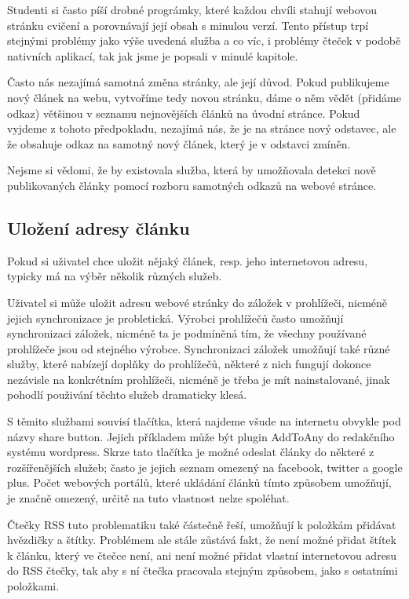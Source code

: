 Studenti si často píší drobné prográmky, které každou chvíli stahují webovou stránku cvičení a porovnávají její obsah s minulou verzí.
Tento přístup trpí stejnými problémy jako výše uvedená služba a co víc, i problémy čteček v podobě nativních aplikací, tak jak jsme je popsali v minulé kapitole. %

Často nás nezajímá samotná změna stránky, ale její důvod.
Pokud publikujeme nový článek na webu, vytvoříme tedy novou stránku, dáme o něm vědět (přidáme odkaz) většinou v seznamu nejnovějších článků na úvodní stránce.
Pokud vyjdeme z tohoto předpokladu, nezajímá nás, že je na stránce nový odstavec, ale že obsahuje odkaz na samotný nový článek, který je v odstavci zmíněn.

Nejsme si vědomi, že by existovala služba, která by umožňovala detekci nově publikovaných články pomocí rozboru samotných odkazů na webové stránce.

\subsection{Uložení adresy článku}

Pokud si uživatel chce uložit nějaký článek, resp. jeho internetovou adresu, typicky má na výběr několik různých služeb.

Uživatel si může uložit adresu webové stránky do záložek v prohlížeči, nicméně jejich synchronizace je probletická.
Výrobci prohlížečů často umožňují synchronizaci záložek, nicméně ta je podmíněná tím, že všechny používané prohlížeče jsou od stejného výrobce.
Synchronizaci záložek umožňují také různé služby, které nabízejí doplňky do prohlížečů, některé z nich fungují dokonce nezávisle na konkrétním prohlížeči, nicméně je třeba je mít nainstalované, jinak pohodlí použivání těchto služeb dramaticky klesá. %

S těmito službami souvisí tlačítka, která najdeme všude na internetu obvykle pod názvy share button.
Jejich příkladem může být plugin AddToAny do redakčního systému wordpress. %
Skrze tato tlačítka je možné odeslat články do některé z rozšířenějších služeb; často je jejich seznam omezený na facebook, twitter a google plus. %
Počet webových portálů, které ukládání článků tímto způsobem umožňují, je značně omezený, určitě na tuto vlastnost nelze spoléhat.

Čtečky RSS tuto problematiku také částečně řeší, umožňují k položkám přidávat hvězdičky a štítky.
Problémem ale stále zůstává fakt, že není možné přidat štítek k článku, který ve čtečce není, ani není možné přidat vlastní internetovou adresu do RSS čtečky, tak aby s ní čtečka pracovala stejným způsobem, jako s ostatními položkami.

